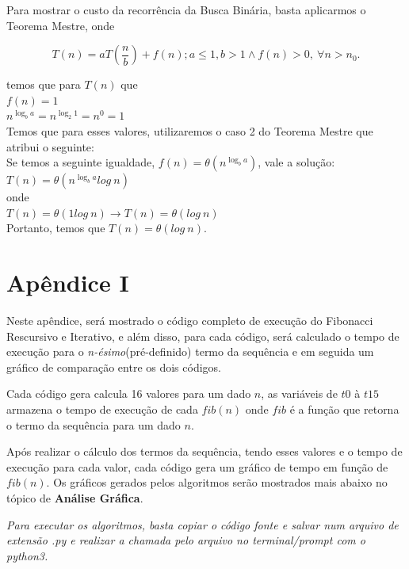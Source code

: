 \documentclass[a4paper, 12pt]{article}
\begin{document}
Para mostrar o custo da recorrência da Busca Binária, basta aplicarmos o Teorema Mestre, onde

\begin{equation}
T(n)= aT(\frac{n}{b})+f(n); a\leq1, b>1 \wedge f(n) > 0, \ \forall n>n_0.
\end{equation}

temos que para $T(n)$ que\\

$f(n)=1$\\
$n^{\log_b a} = n^{\log_2 1} = n^0 = 1$\\

Temos que para esses valores, utilizaremos o caso 2 do Teorema Mestre que atribui o seguinte:\\

Se temos a seguinte igualdade, $f(n) = \theta(n^{\log_b a})$, vale a solução:\\

$T(n) = \theta(n^{\log_b a}log \ n)$ \\

onde \\

$T(n) = \theta(1log \ n) \rightarrow T(n) = \theta(log \ n)$ \\

Portanto, temos que $T(n) = \theta(log \ n)$.

\newpage
\section{Apêndice I}
Neste apêndice, será mostrado o código completo de execução do Fibonacci Rescursivo e Iterativo, e além disso, para cada código, será calculado o tempo de execução para o {\it n-ésimo}(pré-definido) termo da sequência e em seguida um gráfico de comparação entre os dois códigos.

Cada código gera calcula 16 valores para um dado $n$, as variáveis de $t0$ à $t15$ armazena o tempo de execução de cada $fib(n)$ onde $fib$ é a função que retorna o termo da sequência para um dado $n$.

Após realizar o cálculo dos termos da sequência, tendo esses valores e o tempo de execução para cada valor, cada código gera um gráfico de tempo em função de $fib(n)$. Os gráficos gerados pelos algoritmos serão mostrados mais abaixo no tópico de {\bf Análise Gráfica}.

{\it Para executar os algoritmos, basta copiar o código fonte e salvar num arquivo de extensão .py e realizar a chamada pelo arquivo no terminal/prompt com o python3.}\\
\end{document}
